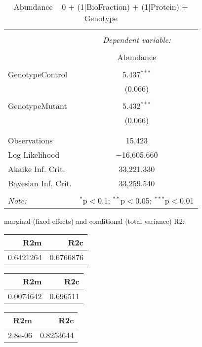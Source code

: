 \documentclass[11pt]{report}
\begin{document}
\begin{table}[!htbp] \centering 
  \caption{Abundance ~ 0 + (1|BioFraction) + (1|Protein) + Genotype} 
  \label{} 
\begin{tabular}{@{\extracolsep{5pt}}lc} 
\\[-1.8ex]\hline 
\hline \\[-1.8ex] 
 & \multicolumn{1}{c}{\textit{Dependent variable:}} \\ 
\cline{2-2} 
\\[-1.8ex] & Abundance \\ 
\hline \\[-1.8ex] 
 GenotypeControl & 5.437$^{***}$ \\ 
  & (0.066) \\ 
  & \\ 
 GenotypeMutant & 5.432$^{***}$ \\ 
  & (0.066) \\ 
  & \\ 
\hline \\[-1.8ex] 
Observations & 15,423 \\ 
Log Likelihood & $-$16,605.660 \\ 
Akaike Inf. Crit. & 33,221.330 \\ 
Bayesian Inf. Crit. & 33,259.540 \\ 
\hline 
\hline \\[-1.8ex] 
\textit{Note:}  & \multicolumn{1}{r}{$^{*}$p$<$0.1; $^{**}$p$<$0.05; $^{***}$p$<$0.01} \\ 
\end{tabular} 
\end{table} 
marginal (fixed effects) and conditional (total variance) R2:

\begin{tabular}{r|r}
\hline
R2m & R2c\\
\hline
0.6421264 & 0.6766876\\
\hline
\end{tabular}

\begin{tabular}{r|r}
\hline
R2m & R2c\\
\hline
0.0074642 & 0.696511\\
\hline
\end{tabular}

\begin{tabular}{r|r}
\hline
R2m & R2c\\
\hline
2.8e-06 & 0.8253644\\
\hline
\end{tabular}
\end{document}

